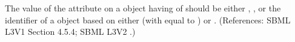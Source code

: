 The value of the attribute  on a \Compartment object having
 of  should be either
, , or the identifier of a \UnitDefinition
object based on either  (with  equal to
) or .  (References: SBML L3V1 Section 4.5.4; SBML L3V2
.)
